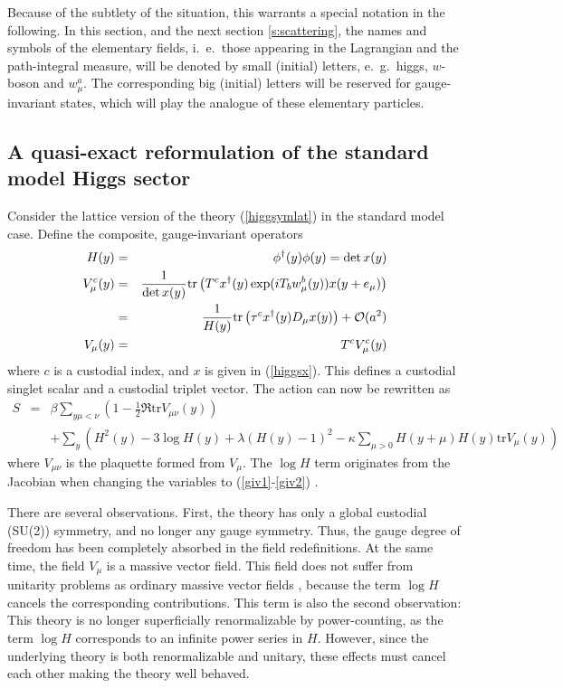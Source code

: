 \documentclass[final,twoside,12pt]{article}
\newcommand*{\no}{\noindent}
\newcommand*{\bea}{\begin{eqnarray}}
\newcommand*{\eea}{\end{eqnarray}}
\newcommand*{\pref}[1]{(\ref{#1})}
\newcommand*{\mn}{{\mu\nu}}
\newcommand*{\prefr}[2]{(\ref{#1}-\ref{#2})}
\newcommand*{\nn}{\nonumber}
\newcommand*{\tr}{\mathrm{tr}}
\newcommand*{\1}{1\!\!\!\bot}
\begin{document}
Because of the subtlety of the situation, this warrants a special notation in the following. In this section, and the next section \ref{s:scattering}, the names and symbols of the elementary fields, i.\ e.\ those appearing in the Lagrangian and the path-integral measure, will be denoted by small (initial) letters, e.\ g.\ higgs, $w$-boson and $w_\mu^a$. The corresponding big (initial) letters will be reserved for gauge-invariant states, which will play the analogue of these elementary particles.

\subsection{A quasi-exact reformulation of the standard model Higgs sector}\label{ss:reformsm}

Consider the lattice version of the theory \pref{higgsymlat} in the standard model case. Define the composite, gauge-invariant operators
\bea
H(y)&=&\phi^\dagger(y)\phi(y)=\det x(y)\label{giv1}\\
V_\mu^c(y)&=&\frac{1}{\det x(y)}\tr\left(T^c x^\dagger(y) \exp(iT_bw^b_\mu(y))x(y+e_\mu)\right)\nn\\
&=&\frac{1}{H(y)}\tr\left(\tau^c x^\dagger(y) D_\mu x(y)\right)+{\cal O}(a^2)\label{giv2}\\
V_\mu(y)&=&T^cV_\mu^c(y)\nn
\eea
\no where $c$ is a custodial index, and $x$ is given in \pref{higgsx}. This defines a custodial singlet scalar and a custodial triplet vector. The action can now be rewritten as \cite{Frohlich:1980gj,Frohlich:1981yi,Langguth:1985eu,Philipsen:1996af,Masson:2010vx,Attard:2017sdn,Kondo:2018qus}
\bea
S&=&\beta\sum_{y\mu<\nu}\left(1-\frac{1}{2}\Re\tr V_{\mn}(y)\right)\nn\\
&&+\sum_y\left(H^2(y)-3\log H(y)+\lambda(H(y)-1)^2-\kappa\sum_{\mu>0}H(y+\mu)H(y)\tr V_\mu(y)\right)\label{giv3}
\eea
\no where $V_\mn$ is the plaquette formed from $V_\mu$. The $\log H$ term originates from the Jacobian when changing the variables to \prefr{giv1}{giv2} \cite{Langguth:1985eu}.

There are several observations. First, the theory has only a global custodial (SU(2)) symmetry, and no longer any gauge symmetry. Thus, the gauge degree of freedom has been completely absorbed in the field redefinitions. At the same time, the field $V_\mu$ is a massive vector field. This field does not suffer from unitarity problems as ordinary massive vector fields \cite{Bohm:2001yx}, because the term $\log H$ cancels the corresponding contributions. This term is also the second observation: This theory is no longer superficially renormalizable by power-counting, as the term $\log H$ corresponds to an infinite power series in $H$. However, since the underlying theory is both renormalizable and unitary, these effects must cancel each other making the theory well behaved.
\end{document}
